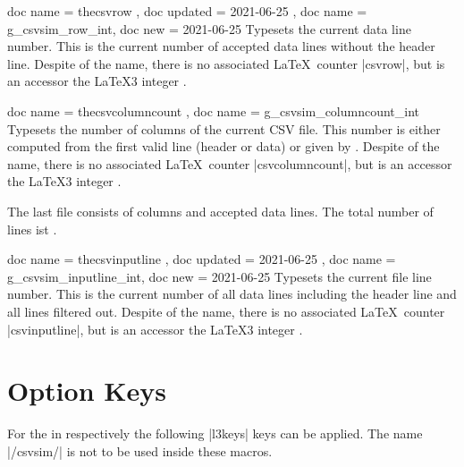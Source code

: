 \documentclass[a4paper,11pt]{ltxdoc}
\begin{document}
\begin{docCommands}{
    { doc name = thecsvrow       , doc updated = 2021-06-25 },
    { doc name = g_csvsim_row_int, doc new     = 2021-06-25 }
  }
  Typesets the current data line number. This is the
  current number of accepted data lines without the header line.
  Despite of the name, there is no associated \LaTeX\ counter |csvrow|,
  but  is an accessor the \LaTeX3 integer
  .
\end{docCommands}


\begin{docCommands}[doc new=2021-06-25]{
    { doc name = thecsvcolumncount },
    { doc name = g_csvsim_columncount_int }
  }
  Typesets the number of columns of the current CSV file. This number
  is either computed from the first valid line (header or data) or
  given by .
  Despite of the name, there is no associated \LaTeX\ counter |csvcolumncount|,
  but  is an accessor the \LaTeX3 integer
  .
\begin{dispExample}
%
The last file consists of \thecsvcolumncount{} columns and
\thecsvrow{} accepted data lines. The total number of lines
ist \thecsvinputline{}.
\end{dispExample}
\end{docCommands}


\begin{docCommands}{
    { doc name = thecsvinputline       , doc updated = 2021-06-25 },
    { doc name = g_csvsim_inputline_int, doc new     = 2021-06-25 }
  }
  Typesets the current file line number. This is the
  current number of all data lines including the header line and all
  lines filtered out.
  Despite of the name, there is no associated \LaTeX\ counter |csvinputline|,
  but  is an accessor the \LaTeX3 integer
  .
\begin{dispExample}
\end{dispExample}
\end{docCommands}





\clearpage
\section{Option Keys}\label{sec:schluessel}%
For the  in  respectively 
the following |l3keys| keys can be applied. The  name |/csvsim/| is not
to be used inside these macros.
\end{document}
